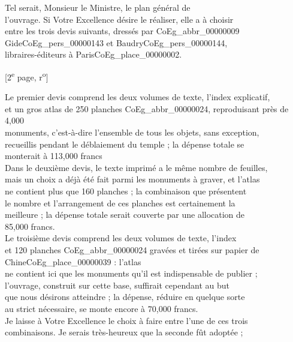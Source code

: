 \documentclass{book}
\begin{document}
\indent Tel serait, Monsieur le Ministre, le plan général de\\
l’ouvrage. Si Votre Excellence désire le réaliser, elle a à choisir\\
entre les trois devis suivants, dressés par \gls{CoEg_abbr_00000009} Gide\gls{CoEg_pers_00000143} et Baudry\gls{CoEg_pers_00000144},\\
libraires-éditeurs à Paris\gls{CoEg_place_00000002}.
{\footnotesize\begin{center} {[2\textsuperscript{e} page, r\textsuperscript{o}]}\end{center}}
\indent Le premier devis comprend les deux volumes de texte, l’index explicatif,\\
et un gros atlas de 250 planches \gls{CoEg_abbr_00000024}, reproduisant près de 4,000\\
monuments, c’est-à-dire l’ensemble de tous les objets, sans exception,\\
recueillis pendant le déblaiement du temple ; la dépense totale se\\
monterait à 113,000 francs\\
\indent Dans le deuxième devis, le texte imprimé a le même nombre de feuilles,\\
mais un choix a déjà été fait parmi les monuments à graver, et l’atlas\\
ne contient plus que 160 planches ; la combinaison que présentent\\
le nombre et l’arrangement de ces planches est certainement la\\
meilleure ; la dépense totale serait couverte par une allocation de\\
85,000 francs.\\
\indent Le troisième devis comprend les deux volumes de texte, l’index\\
et 120 planches \gls{CoEg_abbr_00000024} gravées et tirées sur papier de Chine\gls{CoEg_place_00000039} : l’atlas\\
ne contient ici que les monuments qu’il est indispensable de publier ;\\
l’ouvrage, construit sur cette base, suffirait cependant au but\\
que nous désirons atteindre ; la dépense, réduire en quelque sorte\\
au strict nécessaire, se monte encore à 70,000 francs.\\
\indent Je laisse à Votre Excellence le choix à faire entre l’une de ces trois\\
combinaisons. Je serais très-heureux que la seconde fût adoptée ;\\
\end{document}
